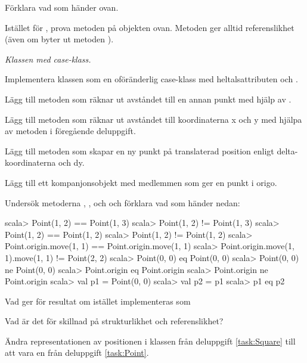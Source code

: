 \Subtask Förklara vad som händer ovan.

\Subtask Istället för \code{==}, prova metoden  på objekten ovan. Metoden  ger alltid referenslikhet (även om byter ut metoden ).

\Task \label{task:Point} \emph{Klassen  med case-klass.}

\Subtask Implementera klassen  som en oföränderlig case-klass med heltalsattributen  och .

\Subtask Lägg till metoden  som räknar ut avståndet till en annan punkt med hjälp av .

\Subtask Lägg till metoden  som räknar ut avståndet till koordinaterna x och y med hjälpa av metoden i föregående deluppgift.

\Subtask Lägg till metoden  som skapar en ny punkt på translaterad position enligt delta-koordinaterna  och {dy}.

\Subtask Lägg till ett kompanjonsobjekt med medlemmen  som ger en punkt i origo.

\Subtask Undersök metoderna \code{==}, \code{!=},  och  och förklara vad som händer nedan:
\begin{REPL}
scala> Point(1, 2) == Point(1, 3)
scala> Point(1, 2) != Point(1, 3)
scala> Point(1, 2) == Point(1, 2)
scala> Point(1, 2) != Point(1, 2)
scala> Point.origin.move(1, 1) == Point.origin.move(1, 1)
scala> Point.origin.move(1, 1).move(1, 1) != Point(2, 2)
scala> Point(0, 0) eq Point(0, 0)
scala> Point(0, 0) ne Point(0, 0)
scala> Point.origin eq Point.origin
scala> Point.origin ne Point.origin
scala> val p1 = Point(0, 0)
scala> val p2 = p1
scala> p1 eq p2
\end{REPL}

\Subtask Vad ger  för resultat om  istället  implementeras som 

\Subtask\Pen Vad är det för skillnad på strukturlikhet och referenslikhet?

\Task \label{task:PointSquare}Ändra representationen av positionen i klassen  från deluppgift \ref{task:Square} till att vara en  från deluppgift \ref{task:Point}.


